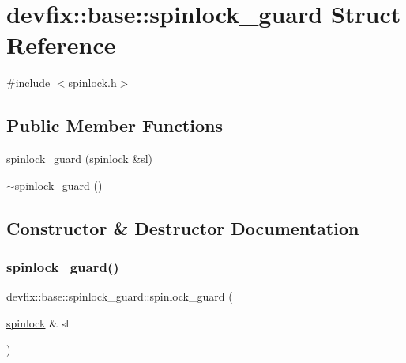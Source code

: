 \hypertarget{structdevfix_1_1base_1_1spinlock__guard}{}\section{devfix\+:\+:base\+:\+:spinlock\+\_\+guard Struct Reference}
\label{structdevfix_1_1base_1_1spinlock__guard}


{\ttfamily \#include $<$spinlock.\+h$>$}

\subsection*{Public Member Functions}
\begin{DoxyCompactItemize}
\item 
\hyperlink{structdevfix_1_1base_1_1spinlock__guard_ac80e993b44241dd5f59c51b9363e9bc8}{spinlock\+\_\+guard} (\hyperlink{structdevfix_1_1base_1_1spinlock}{spinlock} \&sl)
\item 
\hyperlink{structdevfix_1_1base_1_1spinlock__guard_ae1fd374a37a2f7344dd16468270d7b5b}{$\sim$spinlock\+\_\+guard} ()
\end{DoxyCompactItemize}


\subsection{Constructor \& Destructor Documentation}
\mbox{\label{structdevfix_1_1base_1_1spinlock__guard_ac80e993b44241dd5f59c51b9363e9bc8}} 
\subsubsection{\texorpdfstring{spinlock\+\_\+guard()}{spinlock\_guard()}}
{\footnotesize\ttfamily devfix\+::base\+::spinlock\+\_\+guard\+::spinlock\+\_\+guard (\begin{DoxyParamCaption}\item[{\hyperlink{structdevfix_1_1base_1_1spinlock}{spinlock} \&}]{sl }\end{DoxyParamCaption})\hspace{0.3cm}{\ttfamily [inline]}}

